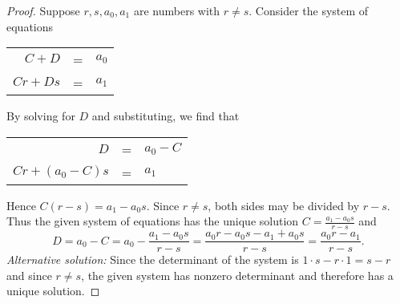 \documentclass[14pt]{extarticle}
\newcommand{\dps}{\displaystyle}
\begin{document}
\begin{proof}
    Suppose \(r, s, a_0, a_1\) are numbers with \(r \neq s\). Consider the system of equations
    \begin{center}
        \begin{tabular}{rcl}
            \(C + D\)   & = & \(a_0\) \\
            \(Cr + Ds\) & = & \(a_1\)
        \end{tabular}
    \end{center}
    By solving for $D$ and substituting, we find that
    \begin{center}
        \begin{tabular}{rcl}
            \(D\)               & = & \(a_0 - C\) \\
            \(Cr + (a_0 - C)s\) & = & \(a_1\)
        \end{tabular}
    \end{center}
    Hence \(C(r-s) = a_1 - a_0s\). Since \(r \neq s\), both sides may be divided by $r - s$. Thus the given system of
    equations has the unique solution \(\dps C = \frac{a_1 - a_0s}{r-s}\) and
    \[
        D = a_0 - C = a_0 - \frac{a_1 - a_0s}{r-s} = \frac{a_0r - a_0s - a_1 + a_0s}{r-s} = \frac{a_0r - a_1}{r-s}.
    \]
    {\it Alternative solution:} Since the determinant of the system is \(1 \cdot s - r \cdot 1 = s - r\) and since
    \(r \neq s\), the given system has nonzero determinant and therefore has a unique solution.
\end{proof}
\end{document}
